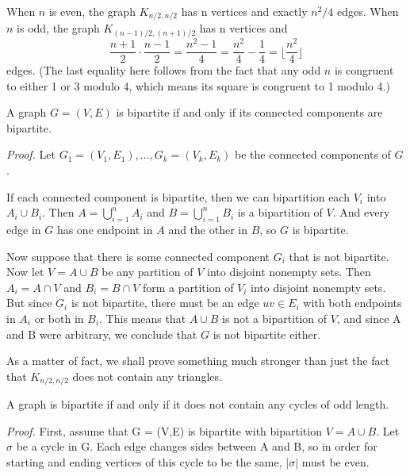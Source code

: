 \documentclass{tufte-handout}
\begin{document}
When \( n \) is even, the graph \( K_{n/2,n/2} \) has n vertices and exactly \( n^2\slash 4 \) edges.
When \( n \) is odd, the graph \( K_{(n-1)/2,(n+1)/2} \) has n vertices and 
\[\frac{n+1}{2}\cdot \frac{n-1}{2} = \frac{n^2-1}{4} = \frac{n^2}{4}-\frac{1}{4} = \lfloor \frac{n^2}{4} \rfloor\]
edges. (The last equality here follows from the fact that any odd \( n \) is congruent to either 1 or 3 modulo 4,
which means its square is congruent to 1 modulo 4.)

\begin{Lemma}
    A graph \( G = (V,E) \) is bipartite if and only if its connected components are bipartite.
\end{Lemma}

\textit{Proof.} Let \(G_1 = (V_1,E_1), \ldots, G_k = (V_k,E_k) \) be the connected components of \( G \).

If each connected component is bipartite, then we can bipartition each \( V_i \) into \( A_i \cup B_i \).
Then \( A = \bigcup_{i=1}^{n} A_i \) and \( B = \bigcup_{i=1}^{n} B_i \) is a bipartition of \( V \).
And every edge in \( G \) has one endpoint in \( A \) and the other in \( B \), so \( G \) is bipartite.

Now suppose that there is some connected component \( G_i \) that is not bipartite. Now let
\(V = A\cup B \) be any partition of \( V \) into disjoint nonempty sets. Then \(A_i=A\cap V\) and
\(B_i = B\cap V\)  form a partition of \( V_i \) into disjoint nonempty sets. But since \( G_i \) is not bipartite,
there must be an edge \( uv \in E_i \) with both endpoints in \( A_i \) or both in \( B_i \).
This means that \( A \cup B \) is not a bipartition of \( V \), and since A and B were arbitrary, we conclude that
\( G \) is not bipartite either. \qedsymbol

As a matter of fact, we shall prove something much stronger than just the fact that \( K_{n/2,n/2} \)
does not contain any triangles. 
\begin{Theorem}
    A graph is bipartite if and only if it does not contain any cycles of odd length.
\end{Theorem}
\textit{Proof.} First, assume that G = (V,E) is bipartite with bipartition \( V = A \cup B \).
Let \(\sigma\) be a cycle in G. Each edge changes sides between A and B, so in order
for starting and ending vertices of this cycle to be the same, \(\left|\sigma\right|\)
must be even.
\end{document}
